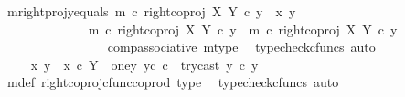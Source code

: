 \begin{isabellebody}
\ m{\isacharunderscore}{\kern0pt}rightproj{\isacharunderscore}{\kern0pt}y{}{\isacharunderscore}{\kern0pt}equals{\isacharcolon}{\kern0pt}\ {\isachardoublequoteopen}m\ {\isasymcirc}\isactrlsub c\ right{\isacharunderscore}{\kern0pt}coproj\ X\ Y\ {\isasymcirc}\isactrlsub c\ y{}\ {\isacharequal}{\kern0pt}\ {\isasymlangle}x{}{\isacharcomma}{\kern0pt}\ y{}{\isasymrangle}{\isachardoublequoteclose}\isanewline
\ \ \ \ \ \ \ \ \ \ \isamarkupfalse%
\ {\isacharminus}{\kern0pt}\ \isanewline
\ \ \ \ \ \ \ \ \ \ \ \ \isamarkupfalse%
\ {\isachardoublequoteopen}m\ {\isasymcirc}\isactrlsub c\ right{\isacharunderscore}{\kern0pt}coproj\ X\ Y\ {\isasymcirc}\isactrlsub c\ y{}\ {\isacharequal}{\kern0pt}\ {\isacharparenleft}{\kern0pt}m\ {\isasymcirc}\isactrlsub c\ right{\isacharunderscore}{\kern0pt}coproj\ X\ Y{\isacharparenright}{\kern0pt}\ {\isasymcirc}\isactrlsub c\ y{}{\isachardoublequoteclose}\isanewline
\ \ \ \ \ \ \ \ \ \ \ \ \ \ \isamarkupfalse%
\ \ comp{\isacharunderscore}{\kern0pt}associative{}\ m{\isacharunderscore}{\kern0pt}type\ \isamarkupfalse%
\ {\isacharparenleft}{\kern0pt}typecheck{\isacharunderscore}{\kern0pt}cfuncs{\isacharcomma}{\kern0pt}\ auto{\isacharparenright}{\kern0pt}\isanewline
\ \ \ \ \ \ \ \ \ \ \ \ \isamarkupfalse%
\ \isamarkupfalse%
\ {\isachardoublequoteopen}{\isachardot}{\kern0pt}{\isachardot}{\kern0pt}{\isachardot}{\kern0pt}\ {\isacharequal}{\kern0pt}\ {\isacharparenleft}{\kern0pt}{\isacharparenleft}{\kern0pt}{\isasymlangle}x{}{\isacharcomma}{\kern0pt}\ y{}{\isasymrangle}\ {\isasymamalg}\ {\isasymlangle}x{}\ {\isasymcirc}\isactrlsub c\ {\isasymbeta}\isactrlbsub Y\ {\isasymsetminus}\ {\isacharparenleft}{\kern0pt}one{\isacharcomma}{\kern0pt}y{}{\isacharparenright}{\kern0pt}\isactrlesub {\isacharcomma}{\kern0pt}\ y{}\isactrlsup c{\isasymrangle}{\isacharparenright}{\kern0pt}\ {\isasymcirc}\isactrlsub c\ \ try{\isacharunderscore}{\kern0pt}cast\ y{}{\isacharparenright}{\kern0pt}\ {\isasymcirc}\isactrlsub c\ y{}{\isachardoublequoteclose}\isanewline
\ \ \ \ \ \ \ \ \ \ \ \ \ \ \isamarkupfalse%
\ m{\isacharunderscore}{\kern0pt}def\ right{\isacharunderscore}{\kern0pt}coproj{\isacharunderscore}{\kern0pt}cfunc{\isacharunderscore}{\kern0pt}coprod\ type{}\ \isamarkupfalse%
\ {\isacharparenleft}{\kern0pt}typecheck{\isacharunderscore}{\kern0pt}cfuncs{\isacharcomma}{\kern0pt}\ auto{\isacharparenright}{\kern0pt}\isanewline

\end{isabellebody}
